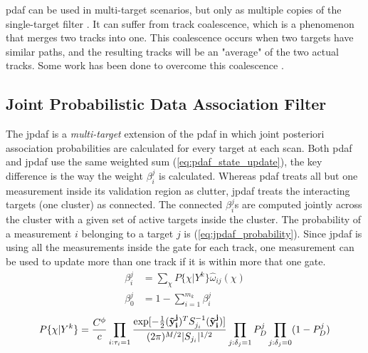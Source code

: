 \gls{pdaf} can be used in multi-\gls{target} scenarios, but only as multiple copies of the single-\gls{target} filter \cite{Fortmann1983}. It can suffer from track coalescence, which is a phenomenon that merges two tracks into one. This coalescence occurs when two \glspl{target} have similar paths, and the resulting tracks will be an "average" of the two actual tracks. Some work has been done to overcome this coalescence \cite{Blom2000}.

\subsection{Joint Probabilistic Data Association Filter}
\label{sec:jpdaf}
The \gls{jpdaf} is a \emph{multi-\gls{target}} extension of the \gls{pdaf} in which joint posteriori association probabilities are calculated for every \gls{target} at each scan. Both \gls{pdaf} and \gls{jpdaf} use the same weighted sum (\ref{eq:pdaf_state_update}), the key difference is the way the weight $\beta_i^j$ is calculated. Whereas \gls{pdaf} treats all but one \gls{measurement} inside its validation region as clutter, \gls{jpdaf} treats the interacting \glspl{target} (one cluster) as connected. The connected $\beta_i^j$s are computed jointly across the cluster with a given set of active \glspl{target} inside the cluster. The probability \cite{Fortmann1983} of a \gls{measurement} $i$ belonging to a \gls{target} $j$ is (\ref{eq:jpdaf_probability}). Since \gls{jpdaf} is using all the \glspl{measurement} inside the gate for each track, one \gls{measurement} can be used to update more than one track if it is within more that one gate.
\begin{equation}
\begin{split}
\beta_i^j &= \sum_{\chi} P\{ \chi | Y^k \} \hat{\omega}_{ij}(\chi) \\
\beta_0^j &= 1 - \sum_{i=1}^{m_k} \beta_i^j
\end{split}
\end{equation}
\begin{equation}
P\{\chi|Y^k\} = \frac{C^\phi}{c} 
				\prod_{i:\tau_i=1} \frac{\mathrm{exp}[-\frac{1}{2}(\boldsymbol{\mathbf{\tilde{y}_i^{j}}})^T S_{j_i}^{-1}(\boldsymbol{\mathbf{\tilde{y}_i^{j}}})]}{(2\pi)^{M/2} |S_{j_i}|^{1/2}}
				\prod_{j:\delta_j=1} P_D^j
				\prod_{j:\delta_j=0} (1 - P_D^j)
\label{eq:jpdaf_probability}
\end{equation} 
